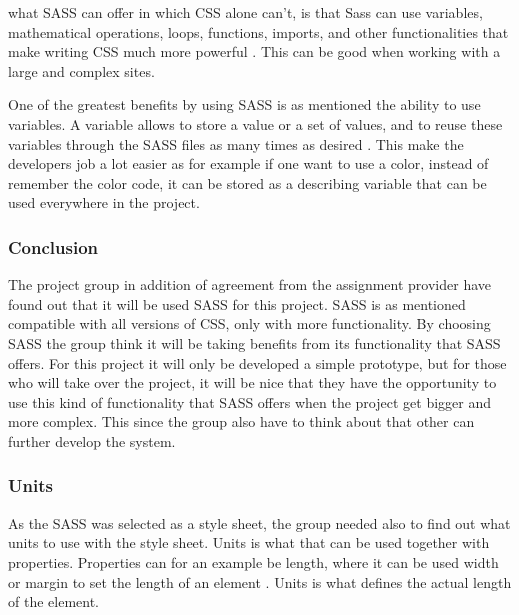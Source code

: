 what SASS can offer in which 
CSS alone can't, is that Sass can use variables, mathematical operations, loops, functions, imports, and other  functionalities that make writing CSS much more powerful \cite{Sass_3}. 
This can be good when working with a large and complex sites.

One of the greatest benefits 
by using SASS is as mentioned the ability to use variables. A variable allows to store a value or a set of values, and to reuse these variables through the SASS files as many times as desired \cite{Sass_3}. 
This make the developers job a lot easier as for example if one want to use a color, instead of remember the color code, it can be stored as a describing variable that can be used everywhere in the project.

\subsubsection{Conclusion}
The project group in addition of agreement from the assignment provider have found out that it will be used SASS for this project. SASS is as mentioned compatible with all versions of CSS, only with more functionality. By choosing SASS the group think it will be taking benefits from its functionality that SASS offers. For this project it will only be developed a simple prototype, but for 
those who will take over the project, it will be nice that they have the opportunity to use this kind of functionality that SASS offers when the project get bigger and more complex. This since the group also have to think about that other can further develop the system.

\subsubsection{Units}
As the SASS was selected as a style sheet, the group needed also to find out what units to use with the style sheet. Units is what that can be used together with properties. Properties can for an example be length, where it can be used width or margin to set the length of an element \cite{Units_1}. 
Units is what defines the actual length of the element.

